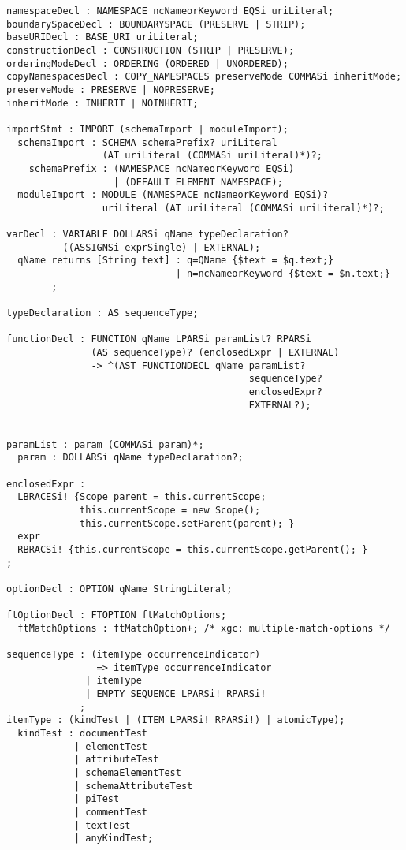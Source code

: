 \begin{Verbatim}[frame=none, fontsize=\footnotesize]
namespaceDecl : NAMESPACE ncNameorKeyword EQSi uriLiteral;
boundarySpaceDecl : BOUNDARYSPACE (PRESERVE | STRIP);
baseURIDecl : BASE_URI uriLiteral;
constructionDecl : CONSTRUCTION (STRIP | PRESERVE);
orderingModeDecl : ORDERING (ORDERED | UNORDERED);
copyNamespacesDecl : COPY_NAMESPACES preserveMode COMMASi inheritMode;
preserveMode : PRESERVE | NOPRESERVE;
inheritMode : INHERIT | NOINHERIT;  

importStmt : IMPORT (schemaImport | moduleImport);
  schemaImport : SCHEMA schemaPrefix? uriLiteral 
                 (AT uriLiteral (COMMASi uriLiteral)*)?;
    schemaPrefix : (NAMESPACE ncNameorKeyword EQSi) 
                   | (DEFAULT ELEMENT NAMESPACE);
  moduleImport : MODULE (NAMESPACE ncNameorKeyword EQSi)? 
                 uriLiteral (AT uriLiteral (COMMASi uriLiteral)*)?;

varDecl : VARIABLE DOLLARSi qName typeDeclaration? 
          ((ASSIGNSi exprSingle) | EXTERNAL);
  qName returns [String text] : q=QName {$text = $q.text;}
                              | n=ncNameorKeyword {$text = $n.text;}
        ;

typeDeclaration : AS sequenceType;
  
functionDecl : FUNCTION qName LPARSi paramList? RPARSi 
               (AS sequenceType)? (enclosedExpr | EXTERNAL)
               -> ^(AST_FUNCTIONDECL qName paramList?
                                           sequenceType?
                                           enclosedExpr?
                                           EXTERNAL?);


paramList : param (COMMASi param)*;
  param : DOLLARSi qName typeDeclaration?;

enclosedExpr :
  LBRACESi! {Scope parent = this.currentScope;
             this.currentScope = new Scope();
             this.currentScope.setParent(parent); }
  expr
  RBRACSi! {this.currentScope = this.currentScope.getParent(); }
;

optionDecl : OPTION qName StringLiteral;

ftOptionDecl : FTOPTION ftMatchOptions;
  ftMatchOptions : ftMatchOption+; /* xgc: multiple-match-options */

sequenceType : (itemType occurrenceIndicator) 
                => itemType occurrenceIndicator
              | itemType
              | EMPTY_SEQUENCE LPARSi! RPARSi!
             ;
itemType : (kindTest | (ITEM LPARSi! RPARSi!) | atomicType);
  kindTest : documentTest
            | elementTest
            | attributeTest
            | schemaElementTest
            | schemaAttributeTest
            | piTest
            | commentTest
            | textTest
            | anyKindTest;


\end{Verbatim}
